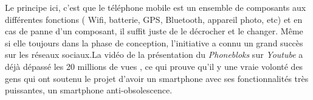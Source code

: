  Le principe ici, c'est que le téléphone mobile est un ensemble de composants aux différentes fonctions ( Wifi, batterie, GPS, Bluetooth, appareil photo, etc) et en cas de panne d'un composant, il suffit juste de le décrocher et le changer. 
Même si elle toujours dans la phase de conception, l'initiative a connu un grand succès sur les réseaux sociaux.La vidéo de la présentation du \textit{Phonebloks} sur \textit{Youtube} a déjà dépassé les 20 millions de vues \cite{pb_yt}, ce qui prouve qu'il y une vraie volonté des gens qui ont soutenu le projet d'avoir un smartphone avec ses fonctionnalités très puissantes, un smartphone anti-obsolescence. 









